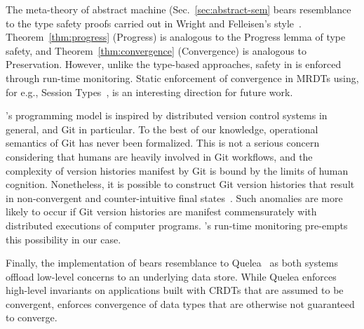 The meta-theory of \quark abstract machine
(Sec.~\ref{sec:abstract-sem} bears resemblance to the type safety
proofs carried out in Wright and Felleisen's style~\cite{WF92}.
Theorem~\ref{thm:progress} (Progress) is analogous to the Progress
lemma of type safety, and Theorem~\ref{thm:convergence} (Convergence)
is analogous to Preservation.  However, unlike the type-based
approaches, safety in \quark is enforced through run-time monitoring.
Static enforcement of convergence in MRDTs using, for e.g., Session
Types~\cite{HNMSession16}, is an interesting direction for future
work.

\quark's programming model is inspired by distributed version control
systems in general, and Git in particular. To the best of our
knowledge, operational semantics of Git has never been formalized.
This is not a serious concern considering that humans are heavily
involved in Git workflows, and the complexity of version histories
manifest by Git is bound by the limits of human cognition.
Nonetheless, it is possible to construct Git version histories that
result in non-convergent and counter-intuitive final
states~\cite{tycon,russell}. Such anomalies are more likely to occur
if Git version histories are manifest commensurately with distributed
executions of computer programs. \quark's run-time monitoring
pre-empts this possibility in our case.

Finally, the implementation of \quark bears resemblance to
Quelea~\cite{pldi15} as both systems offload low-level concerns to an
underlying data store. While Quelea enforces high-level invariants on
applications built with CRDTs that are assumed to be convergent,
\quark enforces convergence of data types that are otherwise not
guaranteed to converge.
